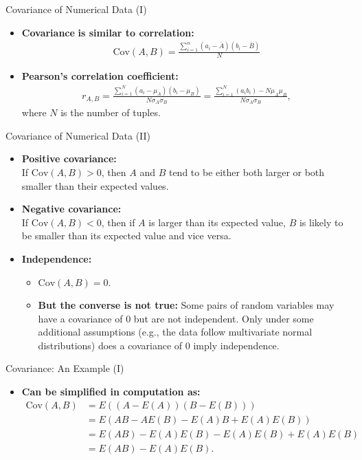 \begin{frame}{Covariance of Numerical Data (I)}
	\begin{itemize}
		\item \textbf{\color{airforceblue}Covariance} \textbf{is similar to 
		correlation:}\\
		\begin{align}
			\text{Cov}(A,B) = 
			\frac{\sum_{i=1}^{n}(a_i-\overline{A})(b_i-\overline{B})}{N} 
		\end{align}
		\item \textbf{Pearson's correlation coefficient:}\\
		\begin{align}
			r_{A,B} = \frac{\sum_{i=1}^{N} 
			(a_i-\mu_A)(b_i-\mu_B)}{N\sigma_A\sigma_B} = 
			\frac{\sum_{i=1}^{N}(a_ib_i)-N\mu_A\mu_B}{N \sigma_A\sigma_B}, 
		\end{align}
		where $N$ is the number of tuples.
	\end{itemize}
\end{frame}

\begin{frame}{Covariance of Numerical Data (II)}
	\begin{itemize}
		\item \textbf{Positive covariance:}\\
		If $\text{Cov}(A,B) > 0$, then $A$ and $B$ tend to be either both 
		larger or both smaller than their expected values.
		\item \textbf{Negative covariance:}\\
		If $\text{Cov}(A,B) < 0$, then if $A$ is larger than its expected 
		value, $B$ is likely to be smaller than its expected value and vice 
		versa.
		\item \textbf{Independence:}
		\begin{itemize}
			\item $\text{Cov}(A,B) = 0$.
			\item \textbf{\color{airforceblue}But the converse is not true:} 
			Some pairs of random variables may have a covariance of $0$ but are 
			not independent. Only under some additional assumptions (e.g., the 
			data follow multivariate normal distributions) does a covariance of 
			$0$ imply independence.
		\end{itemize}
	\end{itemize}
\end{frame}

\begin{frame}{Covariance: An Example (I)}
	\begin{itemize}
		\item \textbf{Can be simplified in computation as:}
		\begin{align}
			\text{Cov}(A,B) & = E((A - E(A))(B-E(B)))            \\
			& = E(AB-AE(B)-E(A)B+E(A)E(B))       \\
			& = E(AB)-E(A)E(B)-E(A)E(B)+E(A)E(B) \\
			& = E(AB)-E(A)E(B).                  
		\end{align}
	\end{itemize}
\end{frame}

